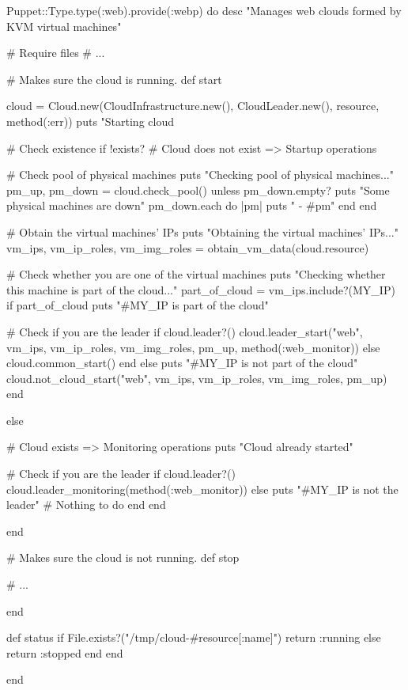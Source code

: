 \begin{rubycode}
Puppet::Type.type(:web).provide(:webp) do
   desc "Manages web clouds formed by KVM virtual machines"

   # Require files
   # ...

   # Makes sure the cloud is running.
   def start
   
      cloud = Cloud.new(CloudInfrastructure.new(), CloudLeader.new(), resource,
                        method(:err))
      puts "Starting cloud %
      
      # Check existence
      if !exists?
         # Cloud does not exist => Startup operations
         
         # Check pool of physical machines
         puts "Checking pool of physical machines..."
         pm_up, pm_down = cloud.check_pool()
         unless pm_down.empty?
            puts "Some physical machines are down"
            pm_down.each do |pm|
               puts " - #{pm}"
            end
         end
         
         # Obtain the virtual machines' IPs
         puts "Obtaining the virtual machines' IPs..."
         vm_ips, vm_ip_roles, vm_img_roles = obtain_vm_data(cloud.resource)
         
         # Check whether you are one of the virtual machines
         puts "Checking whether this machine is part of the cloud..."
         part_of_cloud = vm_ips.include?(MY_IP)
         if part_of_cloud
            puts "#{MY_IP} is part of the cloud"
            
            # Check if you are the leader
            if cloud.leader?()
               cloud.leader_start("web", vm_ips, vm_ip_roles, vm_img_roles,
                                  pm_up, method(:web_monitor))
            else
               cloud.common_start()
            end
         else
            puts "#{MY_IP} is not part of the cloud"
            cloud.not_cloud_start("web", vm_ips, vm_ip_roles, vm_img_roles,
                                  pm_up)
         end
         
      else
         
         # Cloud exists => Monitoring operations
         puts "Cloud already started"
         
         # Check if you are the leader
         if cloud.leader?()
            cloud.leader_monitoring(method(:web_monitor))
         else
            puts "#{MY_IP} is not the leader"      # Nothing to do
         end
      end
      
   end


   # Makes sure the cloud is not running.
   def stop

      # ...
   
   end


   def status
      if File.exists?("/tmp/cloud-#{resource[:name]}")
         return :running
      else
         return :stopped
      end
   end
   
end
\end{rubycode}

